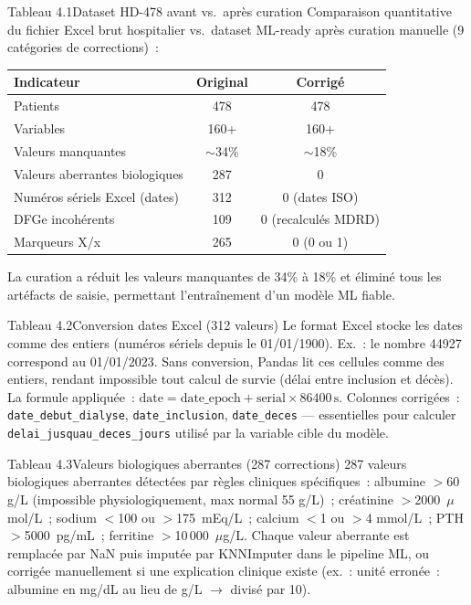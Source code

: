 \documentclass[12pt,a4paper]{article}
\begin{document}
\begin{figbox}{Tableau 4.1}{Dataset HD-478 avant vs.\ après curation}
Comparaison quantitative du fichier Excel brut hospitalier vs.\ dataset
ML-ready après curation manuelle (9 catégories de corrections)~:

\begin{center}
\begin{tabular}{lcc}
\toprule
\textbf{Indicateur} & \textbf{Original} & \textbf{Corrigé} \\
\midrule
Patients & 478 & 478 \\
Variables & 160+ & 160+ \\
Valeurs manquantes & $\sim$34\% & $\sim$18\% \\
Valeurs aberrantes biologiques & 287 & 0 \\
Numéros sériels Excel (dates) & 312 & 0 (dates ISO) \\
DFGe incohérents & 109 & 0 (recalculés MDRD) \\
Marqueurs X/x & 265 & 0 (0 ou 1) \\
\bottomrule
\end{tabular}
\end{center}
La curation a réduit les valeurs manquantes de 34\% à 18\% et éliminé tous les
artéfacts de saisie, permettant l'entraînement d'un modèle ML fiable.
\end{figbox}

\begin{figbox}{Tableau 4.2}{Conversion dates Excel (312 valeurs)}
Le format Excel stocke les dates comme des entiers (numéros sériels depuis le
01/01/1900). Ex.~: le nombre 44927 correspond au 01/01/2023. Sans conversion,
Pandas lit ces cellules comme des entiers, rendant impossible tout calcul de
survie (délai entre inclusion et décès). La formule appliquée~:
$\text{date} = \text{date\_epoch} + \text{serial} \times 86400\,\text{s}$.
Colonnes corrigées~: \texttt{date\_debut\_dialyse}, \texttt{date\_inclusion},
\texttt{date\_deces} --- essentielles pour calculer
\texttt{delai\_jusquau\_deces\_jours} utilisé par la variable cible du modèle.
\end{figbox}

\begin{figbox}{Tableau 4.3}{Valeurs biologiques aberrantes (287 corrections)}
287 valeurs biologiques aberrantes détectées par règles cliniques spécifiques~:
albumine $>$60 g/L (impossible physiologiquement, max normal 55 g/L)~;
créatinine $>$2000~$\mu$mol/L~; sodium $<$100 ou $>$175~mEq/L~; calcium $<$1 ou $>$4
mmol/L~; PTH $>$5000~pg/mL~; ferritine $>$10\,000~$\mu$g/L. Chaque valeur aberrante
est remplacée par NaN puis imputée par KNNImputer dans le pipeline ML,
ou corrigée manuellement si une explication clinique existe (ex.~: unité erronée~:
albumine en mg/dL au lieu de g/L $\rightarrow$ divisé par 10).
\end{figbox}
\end{document}
